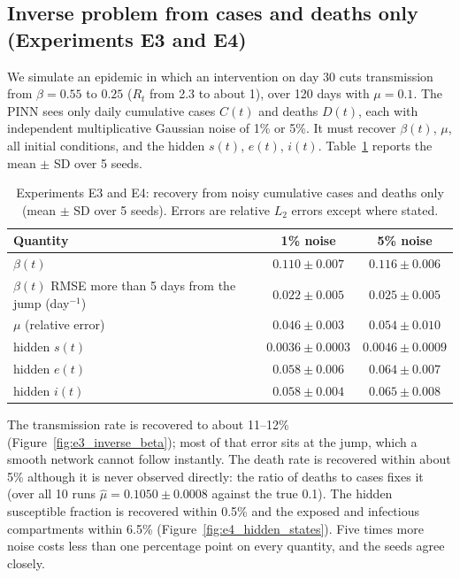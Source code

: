\documentclass[11pt,a4paper]{article}
\begin{document}
\subsection{Inverse problem from cases and deaths only (Experiments E3 and E4)}
We simulate an epidemic in which an intervention on day 30 cuts transmission from $\beta = 0.55$ to $0.25$ ($R_t$ from 2.3 to about 1), over 120 days with $\mu = 0.1$. The PINN sees only daily cumulative cases $C(t)$ and deaths $D(t)$, each with independent multiplicative Gaussian noise of 1\% or 5\%. It must recover $\beta(t)$, $\mu$, all initial conditions, and the hidden $s(t)$, $e(t)$, $i(t)$. Table~\ref{tab:e3e4} reports the mean $\pm$ SD over 5 seeds.

\begin{table}[htbp]
\centering
\caption{Experiments E3 and E4: recovery from noisy cumulative cases and deaths only (mean $\pm$ SD over 5 seeds). Errors are relative $L_2$ errors except where stated.}
\label{tab:e3e4}
\begin{tabular}{lcc}
\toprule
Quantity & 1\% noise & 5\% noise \\
\midrule
$\beta(t)$ & $0.110 \pm 0.007$ & $0.116 \pm 0.006$ \\
$\beta(t)$ RMSE more than 5 days from the jump (day$^{-1}$) & $0.022 \pm 0.005$ & $0.025 \pm 0.005$ \\
$\mu$ (relative error) & $0.046 \pm 0.003$ & $0.054 \pm 0.010$ \\
hidden $s(t)$ & $0.0036 \pm 0.0003$ & $0.0046 \pm 0.0009$ \\
hidden $e(t)$ & $0.058 \pm 0.006$ & $0.064 \pm 0.007$ \\
hidden $i(t)$ & $0.058 \pm 0.004$ & $0.065 \pm 0.008$ \\
\bottomrule
\end{tabular}
\end{table}

The transmission rate is recovered to about 11--12\% (Figure~\ref{fig:e3_inverse_beta}); most of that error sits at the jump, which a smooth network cannot follow instantly. The death rate is recovered within about 5\% although it is never observed directly: the ratio of deaths to cases fixes it (over all 10 runs $\hat\mu = 0.1050 \pm 0.0008$ against the true 0.1). The hidden susceptible fraction is recovered within 0.5\% and the exposed and infectious compartments within 6.5\% (Figure~\ref{fig:e4_hidden_states}). Five times more noise costs less than one percentage point on every quantity, and the seeds agree closely.
\end{document}
